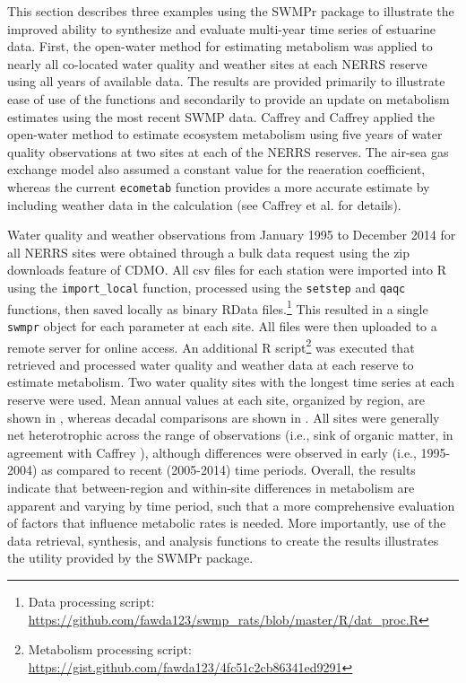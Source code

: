 \documentclass[10pt,letterpaper]{article}\usepackage[]{graphicx}\usepackage[]{color}
\begin{document}
This section describes three examples using the SWMPr package to illustrate the improved ability to synthesize and evaluate multi-year time series of estuarine data. First, the open-water method for estimating metabolism was applied to nearly all co-located water quality and weather sites at each \ac{NERRS} reserve using all years of available data.  The results are provided primarily to illustrate ease of use of the functions and secondarily to provide an update on metabolism estimates using the most recent \ac{SWMP} data.  Caffrey \cite{Caffrey03} and Caffrey \cite{Caffrey04} applied the open-water method to estimate ecosystem metabolism using five years of water quality observations at two sites at each of the \ac{NERRS} reserves.  The air-sea gas exchange model also assumed a constant value for the reaeration coefficient, whereas the current \texttt{ecometab} function provides a more accurate estimate by including weather data in the calculation (see Caffrey et al. \cite{Caffrey14} for details).

Water quality and weather observations from January 1995 to December 2014 for all \ac{NERRS} sites were obtained through a bulk data request using the zip downloads feature of \ac{CDMO}.  All csv files for each station were imported into R using the \texttt{import\_local} function, processed using the \texttt{setstep} and \texttt{qaqc} functions, then saved locally as binary RData files.\footnote{Data processing script: \url{https://github.com/fawda123/swmp_rats/blob/master/R/dat_proc.R}} This resulted in a single \texttt{swmpr} object for each parameter at each site.  All files were then uploaded to a remote server for online access.  An additional R script\footnote{Metabolism processing script: \url{https://gist.github.com/fawda123/4fc51c2cb86341ed9291}} was executed that retrieved and processed water quality and weather data at each reserve to estimate metabolism.  Two water quality sites with the longest time series at each reserve were used.  Mean annual values at each site, organized by region, are shown in , whereas decadal comparisons are shown in .  All sites were generally net heterotrophic across the range of observations (i.e., sink of organic matter, in agreement with Caffrey \cite{Caffrey03}), although differences were observed in early (i.e., 1995-2004) as compared to recent (2005-2014) time periods. Overall, the results indicate that between-region and within-site differences in metabolism are apparent and varying by time period, such that a more comprehensive evaluation of factors that influence metabolic rates is needed.  More importantly, use of the data retrieval, synthesis, and analysis functions to create the results illustrates the utility provided by the SWMPr package.
\end{document}
